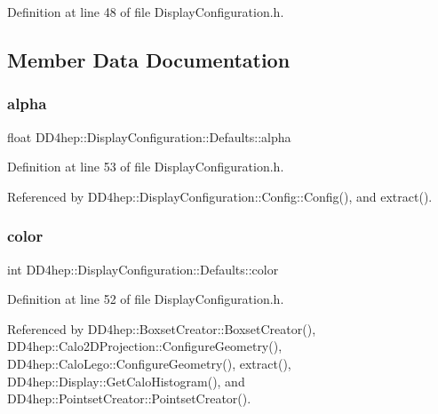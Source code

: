 Definition at line 48 of file Display\+Configuration.\+h.



\subsection{Member Data Documentation}
\hypertarget{struct_d_d4hep_1_1_display_configuration_1_1_defaults_ac0ef410d85c5a9695d6d6f595b6bd085}{}\label{struct_d_d4hep_1_1_display_configuration_1_1_defaults_ac0ef410d85c5a9695d6d6f595b6bd085} 
\subsubsection{\texorpdfstring{alpha}{alpha}}
{\footnotesize\ttfamily float D\+D4hep\+::\+Display\+Configuration\+::\+Defaults\+::alpha}



Definition at line 53 of file Display\+Configuration.\+h.



Referenced by D\+D4hep\+::\+Display\+Configuration\+::\+Config\+::\+Config(), and extract().

\hypertarget{struct_d_d4hep_1_1_display_configuration_1_1_defaults_a0bf12d67de25954afafe95ab865c624b}{}\label{struct_d_d4hep_1_1_display_configuration_1_1_defaults_a0bf12d67de25954afafe95ab865c624b} 
\subsubsection{\texorpdfstring{color}{color}}
{\footnotesize\ttfamily int D\+D4hep\+::\+Display\+Configuration\+::\+Defaults\+::color}



Definition at line 52 of file Display\+Configuration.\+h.



Referenced by D\+D4hep\+::\+Boxset\+Creator\+::\+Boxset\+Creator(), D\+D4hep\+::\+Calo2\+D\+Projection\+::\+Configure\+Geometry(), D\+D4hep\+::\+Calo\+Lego\+::\+Configure\+Geometry(), extract(), D\+D4hep\+::\+Display\+::\+Get\+Calo\+Histogram(), and D\+D4hep\+::\+Pointset\+Creator\+::\+Pointset\+Creator().


